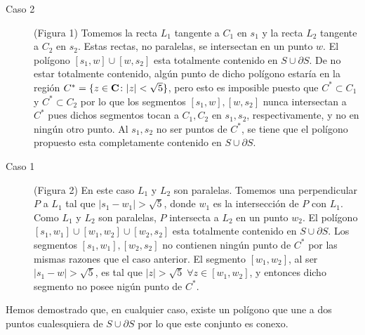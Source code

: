 \documentclass{article}
\begin{document}
\begin{description}
    \item[Caso 2] (Figura 1) Tomemos la recta $L_1$ tangente a $C_1$ en $s_1$ y la recta $L_2$ tangente a $C_2$ en $s_2$.
        Estas rectas, no paralelas, se intersectan en un punto $w$. El polígono $[s_1,w]\cup[w,s_2]$ esta totalmente
        contenido en $S\cup\partial S$. De no estar totalmente contenido, algún punto de dicho polígono estaría en la región
        $C^\ast = \{z\in\mathbf{C}\colon |z| < \sqrt{5}\}$, pero esto es imposible puesto que $C^\ast\subset C_1$ y $C^\ast\subset C_2$
        por lo que los segmentos $[s_1,w],[w,s_2]$ nunca intersectan a $C^\ast$ pues dichos segmentos tocan a $C_1,C_2$
        en $s_1,s_2$, respectivamente, y no en ningún otro punto. Al $s_1,s_2$ no ser puntos de $C^\ast$, se tiene que el
        polígono propuesto esta completamente contenido en $S\cup\partial S$.
    \item[Caso 1] (Figura 2) En este caso $L_1$ y $L_2$ son paralelas. Tomemos una perpendicular $P$ a $L_1$ tal que $|s_1-w_1| > \sqrt{5}$,
        donde $w_1$ es la intersección de $P$ con $L_1$. Como $L_1$ y $L_2$ son paralelas, $P$ intersecta a $L_2$ en un punto
        $w_2$. El polígono $[s_1,w_1]\cup[w_1,w_2]\cup[w_2,s_2]$ esta totalmente contenido en $S\cup\partial S$. Los segmentos
        $[s_1,w_1],[w_2,s_2]$ no contienen ningún punto de $C^\ast$ por las mismas razones que el caso anterior. El segmento
        $[w_1,w_2]$, al ser $|s_1-w| > \sqrt{5}$, es tal que $|z| > \sqrt{5}\;\forall z\in[w_1,w_2]$, y entonces dicho segmento
        no posee nigún punto de $C^\ast$.
\end{description}

Hemos demostrado que, en cualquier caso, existe un polígono que une a dos puntos cualesquiera de $S\cup\partial S$
por lo que este conjunto es conexo.
\end{document}
